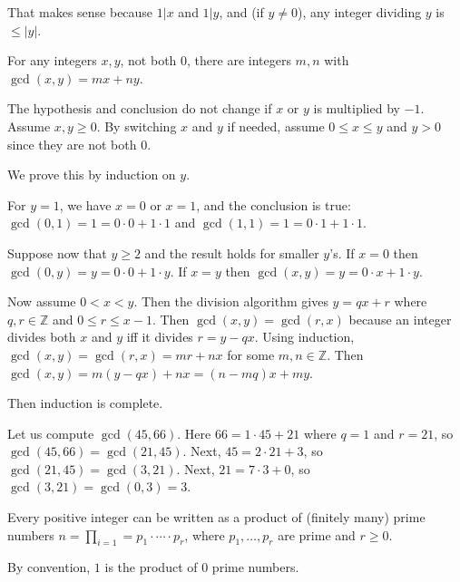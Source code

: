 \documentclass{notes}
\begin{document}
That makes sense because $1 \vert x$ and $1 \vert y$, and (if $y \neq 0$), any integer dividing $y$ is $\leq \left | y \right |$.

\begin{thm}
  For any integers $x, y$, not both $0$, there are integers $m, n$ with $\gcd(x, y) = m x + n y$.
\end{thm}

\begin{prf}
  The hypothesis and conclusion do not change if $x$ or $y$ is multiplied by $-1$.
  Assume $x, y \geq 0$.
  By switching $x$ and $y$ if needed, assume $0 \leq x \leq y$ and $y > 0$ since they are not both $0$.

  We prove this by induction on $y$.

  For $y = 1$, we have $x = 0$ or $x = 1$, and the conclusion is true: $\gcd(0, 1) = 1 = 0 \cdot 0 + 1 \cdot 1$ and $\gcd(1, 1) = 1 = 0 \cdot 1 + 1 \cdot 1$.

  Suppose now that $y \geq 2$ and the result holds for smaller $y$'s.
  If $x = 0$ then $\gcd(0, y) = y = 0 \cdot 0 + 1 \cdot y$.
  If $x = y$ then $\gcd(x, y) = y = 0 \cdot x + 1 \cdot y$.

  Now assume $0 < x < y$.
  Then the division algorithm gives $y = q x + r$ where $q, r \in \mathbb Z$ and $0 \leq r \leq x - 1$.
  Then $\gcd(x, y) = \gcd(r, x)$ because an integer divides both $x$ and $y$ iff it divides $r = y - q x$.
  Using induction, $\gcd(x, y) = \gcd(r, x) = m r + n x$ for some $m, n \in \mathbb Z$.
  Then $\gcd(x, y) = m (y - q x) + n x = (n - m q) x + m y$.

  Then induction is complete.
\end{prf}

\underline{}

Let us compute $\gcd(45, 66)$.
Here $66 = 1 \cdot 45 + 21$ where $q = 1$ and $r = 21$, so $\gcd(45, 66) = \gcd(21, 45)$.
Next, $45 = 2 \cdot 21 + 3$, so $\gcd(21, 45) = \gcd(3, 21)$.
Next, $21 = 7 \cdot 3 + 0$, so $\gcd(3, 21) = \gcd(0, 3) = 3$.

\begin{thm}
  Every positive integer can be written as a product of (finitely many) prime numbers $n = \prod_{i = 1} = p_1 \cdot \cdots \cdot p_r$, where $p_1, \dots, p_r$ are prime and $r \geq 0$.
\end{thm}

\begin{note}
  By convention, $1$ is the product of $0$ prime numbers.
\end{note}
\end{document}
